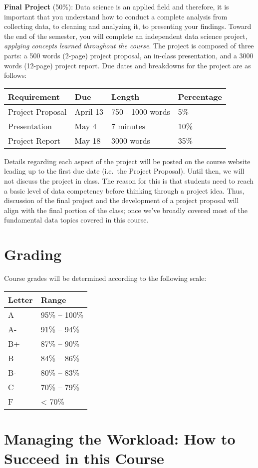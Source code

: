 \documentclass[
  12pt,
]{article}
\begin{document}
\textbf{Final Project} (50\%): Data science is an applied field and
therefore, it is important that you understand how to conduct a complete
analysis from collecting data, to cleaning and analyzing it, to
presenting your findings. Toward the end of the semester, you will
complete an independent data science project, \emph{applying concepts
learned throughout the course}. The project is composed of three parts:
a 500 words (2-page) project proposal, an in-class presentation, and a
3000 words (12-page) project report. Due dates and breakdowns for the
project are as follows:

\begin{longtable}[]{@{}llll@{}}
\toprule
\textbf{Requirement} & \textbf{Due} & \textbf{Length} &
\textbf{Percentage}\tabularnewline
\midrule
\endhead
Project Proposal & April 13 & 750 - 1000 words & 5\%\tabularnewline
Presentation & May 4 & 7 minutes & 10\%\tabularnewline
Project Report & May 18 & 3000 words & 35\%\tabularnewline
\bottomrule
\end{longtable}

Details regarding each aspect of the project will be posted on the
course website leading up to the first due date (i.e.~the Project
Proposal). Until then, we will not discuss the project in class. The
reason for this is that students need to reach a basic level of data
competency before thinking through a project idea. Thus, discussion of
the final project and the development of a project proposal will align
with the final portion of the class; once we've broadly covered most of
the fundamental data topics covered in this course.

\hypertarget{grading}{%
\section{Grading}\label{grading}}

Course grades will be determined according to the following scale:

\begin{longtable}[]{@{}ll@{}}
\toprule
Letter & Range\tabularnewline
\midrule
\endhead
A & 95\% -- 100\%\tabularnewline
A- & 91\% -- 94\%\tabularnewline
B+ & 87\% -- 90\%\tabularnewline
B & 84\% -- 86\%\tabularnewline
B- & 80\% -- 83\%\tabularnewline
C & 70\% -- 79\%\tabularnewline
F & \textless{} 70\%\tabularnewline
\bottomrule
\end{longtable}

\hypertarget{managing-the-workload-how-to-succeed-in-this-course}{%
\section{Managing the Workload: How to Succeed in this
Course}\label{managing-the-workload-how-to-succeed-in-this-course}}
\end{document}
